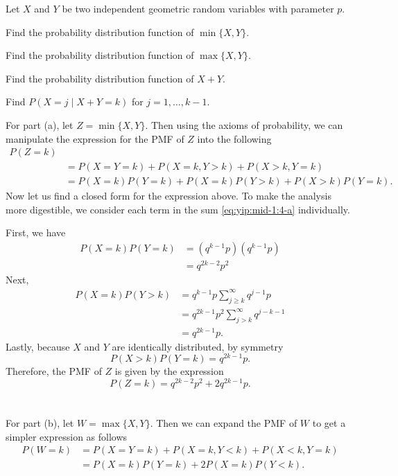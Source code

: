 \begin{problem}
  Let \(X\) and \(Y\) be two independent geometric random variables with
  parameter \(p\).
  \begin{alphlist}
  \item Find the probability distribution function of \(\min\{X,Y\}\).
  \item Find the probability distribution function of \(\max\{X,Y\}\).
  \item Find the probability distribution function of \(X+Y\).
  \item Find \(P(X=j\mid X+Y=k)\) for \(j=1,\dotsc,k-1\).
  \end{alphlist}
\end{problem}
\begin{solution*}
  For part (a), let \(Z=\min\{X,Y\}\). Then using the axioms of
  probability, we can manipulate the expression for the PMF of \(Z\) into
  the following
  \begin{equation}
    \label{eq:yip:mid-1:4-a}
    \begin{aligned}
      P(Z=k)\\
      &=P(X=Y=k)+P(X=k,Y>k)+P(X>k,Y=k)\\
      &=P(X=k)P(Y=k)+P(X=k)P(Y>k)+P(X>k)P(Y=k).
    \end{aligned}
  \end{equation}
  Now let us find a closed form for the expression above. To make the
  analysis more digestible, we consider each term in the sum
  \eqref{eq:yip:mid-1:4-a} individually.

  First, we have
  \begin{align*}
    P(X=k)P(Y=k)
    &=(q^{k-1}p)(q^{k-1}p)\\
    &=q^{2k-2}p^2
  \end{align*}
  Next,
  \begin{align*}
    P(X=k)P(Y>k)
    &=q^{k-1}p\sum_{j\geq k}^\infty q^{j-1}p\\
    &=q^{2k-1}p^2\sum_{j>k}^\infty q^{j-k-1}\\
    &=q^{2k-1}p.
  \end{align*}
  Lastly, because \(X\) and \(Y\) are identically distributed, by symmetry
  \[
    P(X>k)P(Y=k)=q^{2k-1}p.
  \]
  Therefore, the PMF of \(Z\) is given by the expression
  \[
    P(Z=k)=q^{2k-2}p^2+2q^{2k-1}p.
  \]
  \\\\
  For part (b), let \(W=\max\{X,Y\}\). Then we can expand the PMF of \(W\)
  to get a simpler expression as follows
  \begin{equation}
    \label{eq:yip:mid-1:4-b}
    \begin{aligned}
      P(W=k)
      &=P(X=Y=k)+P(X=k,Y<k)+P(X<k,Y=k)\\
      &=P(X=k)P(Y=k)+2P(X=k)P(Y<k).
    \end{aligned}
  \end{equation}


\end{solution*}
